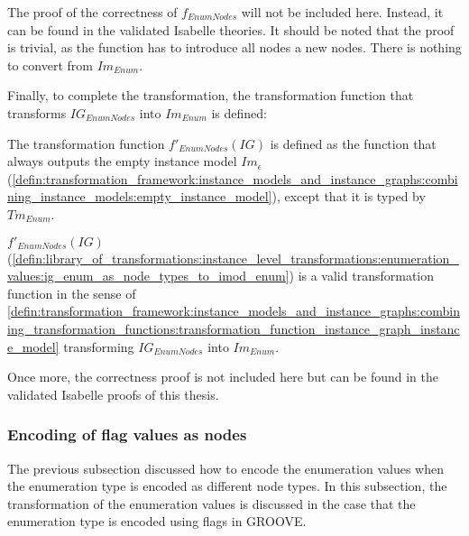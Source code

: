 The proof of the correctness of $f_{EnumNodes}$ will not be included here. Instead, it can be found in the validated Isabelle theories. It should be noted that the proof is trivial, as the function has to introduce all nodes a new nodes. There is nothing to convert from $Im_{Enum}$.

Finally, to complete the transformation, the transformation function that transforms $IG_{EnumNodes}$ into $Im_{Enum}$ is defined:

\begin{defin}
\label{defin:library_of_transformations:instance_level_transformations:enumeration_values:ig_enum_as_node_types_to_imod_enum}
The transformation function $f'_{EnumNodes}(IG)$ is defined as the function that always outputs the empty instance model $Im_\epsilon$ (\cref{defin:transformation_framework:instance_models_and_instance_graphs:combining_instance_models:empty_instance_model}), except that it is typed by $Tm_{Enum}$.
\end{defin}

\begin{thm}
\label{defin:library_of_transformations:instance_level_transformations:enumeration_values:ig_class_as_node_types_to_imod_class_func}
$f'_{EnumNodes}(IG)$ (\cref{defin:library_of_transformations:instance_level_transformations:enumeration_values:ig_enum_as_node_types_to_imod_enum}) is a valid transformation function in the sense of \cref{defin:transformation_framework:instance_models_and_instance_graphs:combining_transformation_functions:transformation_function_instance_graph_instance_model} transforming $IG_{EnumNodes}$ into $Im_{Enum}$.
\end{thm}

Once more, the correctness proof is not included here but can be found in the validated Isabelle proofs of this thesis.

\subsubsection{Encoding of flag values as nodes}

The previous subsection discussed how to encode the enumeration values when the enumeration type is encoded as different node types. In this subsection, the transformation of the enumeration values is discussed in the case that the enumeration type is encoded using flags in GROOVE.

